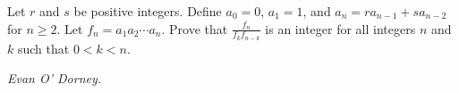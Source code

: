 Let $r$ and $s$ be positive integers. Define $a_0 = 0$, $a_1 = 1$, and $a_n = ra_{n-1} + sa_{n-2}$ for $n \geq 2$. Let $f_n = a_1a_2\cdots a_n$. Prove that $\displaystyle\frac{f_n}{f_kf_{n-k}}$ is an integer for all integers $n$ and $k$ such that $0 < k < n$.

\textit{Evan O' Dorney.}